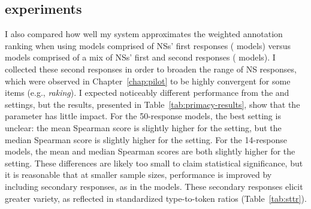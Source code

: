 %
%


\subsection{ experiments}
\label{sec:exp-primacy}
I also compared how well my system approximates the weighted annotation ranking when using models comprised of NSs' first responses ( models) versus models comprised of a mix of NSs' first and second responses ( models). I collected these second responses in order to broaden the range of NS responses, which were observed in Chapter~\ref{chap:pilot} to be highly convergent for some items (e.g., \textit{raking}). I expected noticeably different performance from the  and  settings, but the results, presented in Table~\ref{tab:primacy-results}, show that the parameter has little impact. For the 50-response models, the best setting is unclear: the mean Spearman score is slightly higher for the  setting, but the median Spearman score is slightly higher for the  setting. For the 14-response models, the mean and median Spearman scores are both slightly higher for the  setting. These differences are likely too small to claim statistical significance, but it is reasonable that at smaller sample sizes, performance is improved by including secondary responses, as in the  models. These secondary responses elicit greater variety, as reflected in standardized type-to-token ratios (Table~\ref{tab:sttr}).


